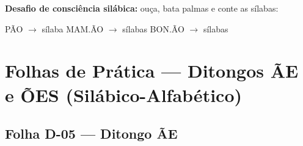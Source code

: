 \begin{somsilaba}[title={\faMusic~Som das S\'ilabas --- B\^onus (n\~ao vale nota)}]
\textbf{Desafio de consci\^encia sil\'abica:} ou\c{c}a, bata palmas e conte as s\'ilabas:
\begin{center}
P\~AO $\rightarrow$ \underline{\hspace{1cm}} s\'ilaba \quad MAM.\~AO $\rightarrow$ \underline{\hspace{1cm}} s\'ilabas \quad BON.\~AO $\rightarrow$ \underline{\hspace{1cm}} s\'ilabas
\end{center}
\end{somsilaba}



\section{Folhas de Prática --- Ditongos ÃE e ÕES (Silábico-Alfabético)}


\subsection{Folha D-05 --- Ditongo ÃE}

